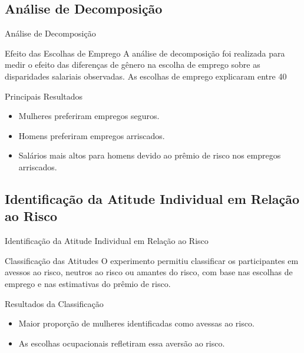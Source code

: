 \documentclass[aspectratio=169, xcolor={dvipsnames}, 10pt, brazil]{beamer}
\begin{document}
\subsection{Análise de Decomposição}
\begin{frame}{Análise de Decomposição}

    \begin{block}{Efeito das Escolhas de Emprego}
        A análise de decomposição foi realizada para medir o efeito das diferenças de gênero na escolha de emprego sobre as disparidades salariais observadas. As escolhas de emprego explicaram entre 40%
    \end{block}

    \begin{block}{Principais Resultados}
        \begin{itemize}
            \item Mulheres preferiram empregos seguros.
            \item Homens preferiram empregos arriscados.
            \item Salários mais altos para homens devido ao prêmio de risco nos empregos arriscados.
        \end{itemize}
    \end{block}

\end{frame}

\subsection{Identificação da Atitude Individual em Relação ao Risco}
\begin{frame}{Identificação da Atitude Individual em Relação ao Risco}

    \begin{block}{Classificação das Atitudes}
        O experimento permitiu classificar os participantes em avessos ao risco, neutros ao risco ou amantes do risco, com base nas escolhas de emprego e nas estimativas do prêmio de risco.
    \end{block}

    \begin{block}{Resultados da Classificação}
        \begin{itemize}
            \item Maior proporção de mulheres identificadas como avessas ao risco.
            \item As escolhas ocupacionais refletiram essa aversão ao risco.
        \end{itemize}
    \end{block}

\end{frame}
\end{document}
